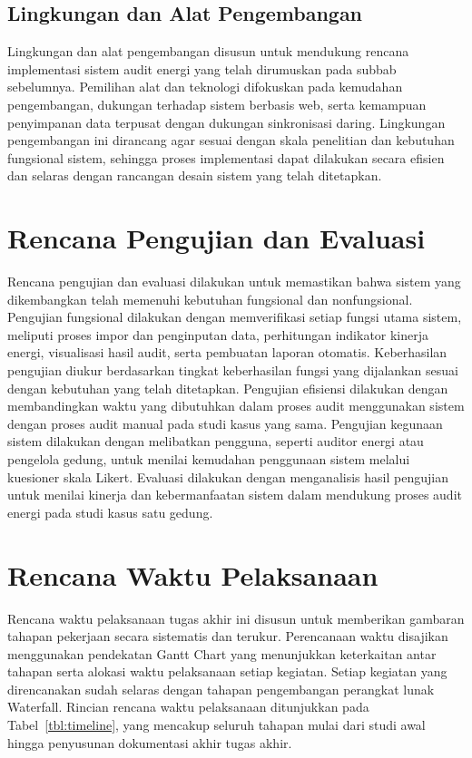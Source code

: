 \subsection{Lingkungan dan Alat Pengembangan}
Lingkungan dan alat pengembangan disusun untuk mendukung rencana implementasi sistem audit energi yang telah dirumuskan pada subbab sebelumnya. Pemilihan alat dan teknologi difokuskan pada kemudahan pengembangan, dukungan terhadap sistem berbasis web, serta kemampuan penyimpanan data terpusat dengan dukungan sinkronisasi daring. Lingkungan pengembangan ini dirancang agar sesuai dengan skala penelitian dan kebutuhan fungsional sistem, sehingga proses implementasi dapat dilakukan secara efisien dan selaras dengan rancangan desain sistem yang telah ditetapkan.



\section{Rencana Pengujian dan Evaluasi}
Rencana pengujian dan evaluasi dilakukan untuk memastikan bahwa sistem yang dikembangkan telah memenuhi kebutuhan fungsional dan nonfungsional. Pengujian fungsional dilakukan dengan memverifikasi setiap fungsi utama sistem, meliputi proses impor dan penginputan data, perhitungan indikator kinerja energi, visualisasi hasil audit, serta pembuatan laporan otomatis. Keberhasilan pengujian diukur berdasarkan tingkat keberhasilan fungsi yang dijalankan sesuai dengan kebutuhan yang telah ditetapkan. Pengujian efisiensi dilakukan dengan membandingkan waktu yang dibutuhkan dalam proses audit menggunakan sistem dengan proses audit manual pada studi kasus yang sama. Pengujian kegunaan sistem dilakukan dengan melibatkan pengguna, seperti auditor energi atau pengelola gedung, untuk menilai kemudahan penggunaan sistem melalui kuesioner skala Likert. Evaluasi dilakukan dengan menganalisis hasil pengujian untuk menilai kinerja dan kebermanfaatan sistem dalam mendukung proses audit energi pada studi kasus satu gedung.

\section{Rencana Waktu Pelaksanaan}
Rencana waktu pelaksanaan tugas akhir ini disusun untuk memberikan gambaran tahapan pekerjaan secara sistematis dan terukur. Perencanaan waktu disajikan menggunakan pendekatan Gantt Chart yang menunjukkan keterkaitan antar tahapan serta alokasi waktu pelaksanaan setiap kegiatan. Setiap kegiatan yang direncanakan sudah selaras dengan tahapan pengembangan perangkat lunak Waterfall. Rincian rencana waktu pelaksanaan ditunjukkan pada Tabel~\ref{tbl:timeline}, yang mencakup seluruh tahapan mulai dari studi awal hingga penyusunan dokumentasi akhir tugas akhir.

